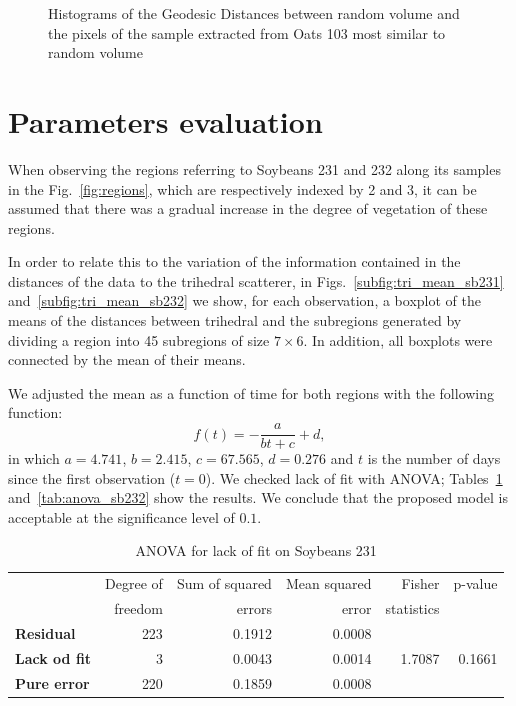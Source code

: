 \documentclass[12pt]{article}
\begin{document}
\begin{figure}[hbt]
\centering
{}
\caption{Histograms of the Geodesic Distances between random volume and the pixels of the sample extracted from Oats 103 most similar to random volume}
\label{fig:ot103_hist_rv}
\end{figure}

\section{Parameters evaluation}
When observing the regions referring to Soybeans 231 and 232 along its samples in the Fig.~\ref{fig:regions}, which are respectively indexed by 2 and 3, it can be assumed that there was a gradual increase in the degree of vegetation of these regions.

In order to relate this to the variation of the information contained in the distances of the data to the trihedral scatterer, in Figs.~\ref{subfig:tri_mean_sb231} and~\ref{subfig:tri_mean_sb232} we show, for each observation, a boxplot of the means of the distances between trihedral and the subregions generated by dividing a region into 45 subregions of size $7\times 6$.
In addition, all boxplots were connected by the mean of their means.

We adjusted the mean as a function of time for both regions with the following function:
\begin{equation}
f(t) = -\frac{a}{bt + c} + d,
\end{equation}
in which $a = 4.741$, $b = 2.415$, $c = 67.565$, $d = 0.276$ and $t$ is the number of days since the first observation ($t = 0$).
We checked lack of fit with ANOVA; Tables~\ref{tab:anova_sb231} and~\ref{tab:anova_sb232} show the results.
We conclude that the proposed model is acceptable at the significance level of $0.1$.

\begin{table}[hbt]
  \centering
  \caption{ANOVA for lack of fit on Soybeans 231}
  \label{tab:anova_sb231}
  \begin{tabular}{lrrrrr}
    \toprule
    & Degree of & Sum of squared & Mean squared & Fisher & p-value\\
    & freedom & errors & error & statistics &\\
    \cmidrule(lr){2-6}
    \textbf{Residual} & 223 & 0.1912 & 0.0008 & &\\
    \textbf{Lack od fit} & 3 & 0.0043 & 0.0014 & 1.7087 & 0.1661\\
    \textbf{Pure error} & 220 & 0.1859 & 0.0008 & &\\
    \bottomrule
  \end{tabular}
\end{table}
\end{document}
